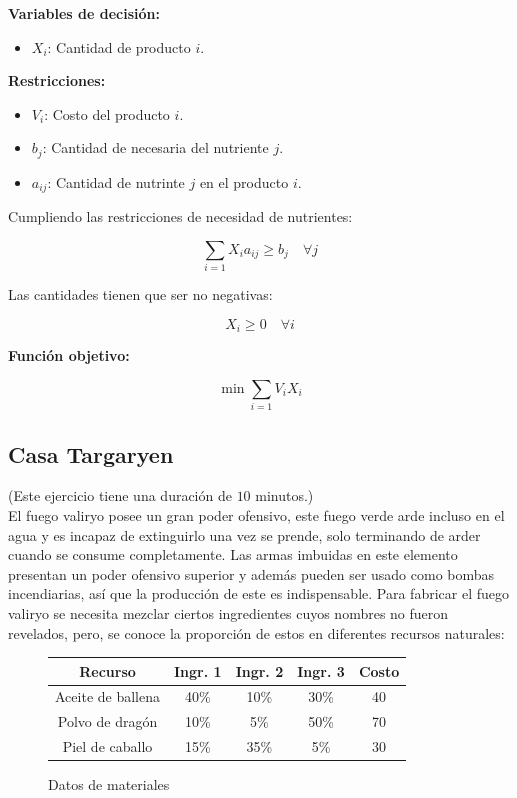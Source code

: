 \documentclass[a4paper,10pt,twocolumn]{article}
\theoremstyle{theorem}
\theoremstyle{definition}
\theoremstyle{remark}
\begin{document}
\textbf{Variables de decisión:}

\begin{itemize}
	\item $X_i$: Cantidad de producto $i$.
\end{itemize}

\textbf{Restricciones:}

\begin{itemize}
	\item $V_i$: Costo del producto $i$.
	\item $b_j$: Cantidad de necesaria del nutriente $j$.
	\item $a_{ij}$: Cantidad de nutrinte $j$ en el producto $i$.
\end{itemize}

Cumpliendo las restricciones de necesidad de nutrientes:

$$
\sum_{i=1} X_i a_{ij} \ge b_j \quad \forall j
$$

Las cantidades tienen que ser no negativas:

$$
X_i \ge 0 \quad \forall i
$$

\textbf{Función objetivo:}

$$
\min \sum_{i=1} V_i X_i
$$


	\subsection{Casa Targaryen}\label{subsec:ejer_3}
(Este ejercicio tiene una duración de $10$ minutos.)\\

El fuego valiryo posee un gran poder ofensivo, este fuego verde arde incluso en el agua y es incapaz de extinguirlo una vez se prende, solo terminando de arder cuando se consume completamente. Las armas imbuidas en este elemento presentan un poder ofensivo superior y además pueden ser usado como bombas incendiarias, así que la producción de este es indispensable. Para fabricar el fuego valiryo se necesita mezclar ciertos ingredientes cuyos nombres no fueron revelados, pero, se conoce la proporción de estos en diferentes recursos naturales:

\begin{figure}[h!]%
	\begin{center}
		\begin{tabular}{|c|c|c|c|c|} \hline
		Recurso				& Ingr. 1 & Ingr. 2 	& Ingr. 3   & Costo  \\ \hline
		Aceite de ballena	& 40\%			& 10\%				& 30\%			  & 40		\\ \hline
		Polvo de dragón		& 10\%			&  5\%				& 50\%	  		  & 70		\\ \hline
		Piel de caballo		& 15\%			& 35\%				&  5\%	  		  & 30		\\ \hline
		\end{tabular}
	\caption{Datos de materiales}\label{fig:ejer_3}
	\end{center}
\end{figure}
\end{document}
